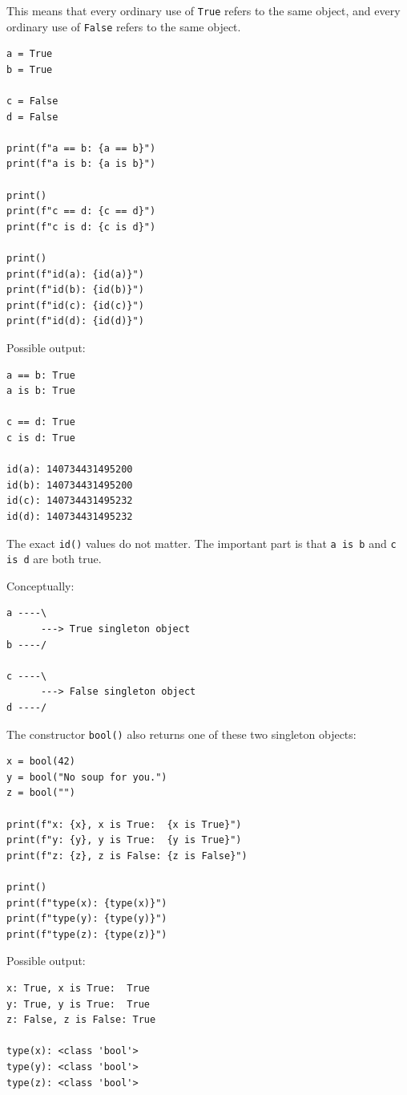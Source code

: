 This means that every ordinary use of \texttt{True} refers to the same object, and every ordinary use of \texttt{False} refers to the same object.

\begin{verbatim}
a = True
b = True

c = False
d = False

print(f"a == b: {a == b}")
print(f"a is b: {a is b}")

print()
print(f"c == d: {c == d}")
print(f"c is d: {c is d}")

print()
print(f"id(a): {id(a)}")
print(f"id(b): {id(b)}")
print(f"id(c): {id(c)}")
print(f"id(d): {id(d)}")
\end{verbatim}

Possible output:

\begin{verbatim}
a == b: True
a is b: True

c == d: True
c is d: True

id(a): 140734431495200
id(b): 140734431495200
id(c): 140734431495232
id(d): 140734431495232
\end{verbatim}

The exact \texttt{id()} values do not matter. The important part is that \texttt{a is b} and \texttt{c is d} are both true.

Conceptually:

\begin{verbatim}
a ----\
      ---> True singleton object
b ----/

c ----\
      ---> False singleton object
d ----/
\end{verbatim}

The constructor \texttt{bool()} also returns one of these two singleton objects:

\begin{verbatim}
x = bool(42)
y = bool("No soup for you.")
z = bool("")

print(f"x: {x}, x is True:  {x is True}")
print(f"y: {y}, y is True:  {y is True}")
print(f"z: {z}, z is False: {z is False}")

print()
print(f"type(x): {type(x)}")
print(f"type(y): {type(y)}")
print(f"type(z): {type(z)}")
\end{verbatim}

Possible output:

\begin{verbatim}
x: True, x is True:  True
y: True, y is True:  True
z: False, z is False: True

type(x): <class 'bool'>
type(y): <class 'bool'>
type(z): <class 'bool'>
\end{verbatim}

